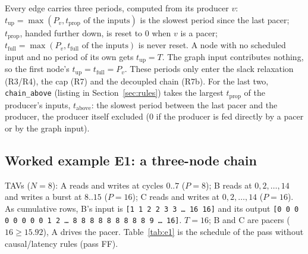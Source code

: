 \documentclass[10pt,a4paper]{article}
\newcommand{\code}[1]{\texttt{#1}}
\newcommand{\Tg}{T}           %
\newcommand{\NF}{N}            %
\begin{document}
Every edge carries three periods, computed from its producer $v$:
$t_{\mathrm{up}}=\max(P_v, t_{\mathrm{prop}}\text{ of the inputs})$ is the slowest
period since the last pacer; $t_{\mathrm{prop}}$, handed further down, is reset to
0 when $v$ is a pacer; $t_{\mathrm{full}}=\max(P_v, t_{\mathrm{full}}\text{ of the
inputs})$ is never reset. A node with no scheduled input and no period of its own
gets $t_{\mathrm{up}}=\Tg$. The graph input contributes nothing, so the first node's
$t_{\mathrm{up}}=t_{\mathrm{full}}=P_v$. These periods only enter the slack
relaxation (R3/R4), the cap (R7) and the decoupled chain (R7b). For the last two,
\code{chain\_above} (listing in Section~\ref{sec:rules}) takes the largest
$t_{\mathrm{prop}}$ of the producer's inputs, $t_{\mathrm{above}}$: the slowest period
between the last pacer and the producer, the producer itself excluded (0 if the
producer is fed directly by a pacer or by the graph input).

\subsection{Worked example E1: a three-node chain}\label{sec:e1}

\begin{center}
\end{center}

TAVs ($\NF=8$): A reads and writes at cycles $0..7$ ($P=8$); B reads at
$0,2,\dots,14$ and writes a burst at $8..15$ ($P=16$); C reads and writes at
$0,2,\dots,14$ ($P=16$). As cumulative rows, B's input is
\code{[1 1 2 2 3 3 \dots\ 16 16]} and its output
\code{[0 0 0 0 0 0 0 0 1 2 \dots\ 8 8 8 8 8 8 8 8 8 9 \dots\ 16]}. $\Tg=16$; B and
C are pacers ($16\ge 15.92$), A drives the pacer. Table~\ref{tab:e1} is the
schedule of the pass without causal/latency rules (pass FF).
\end{document}
